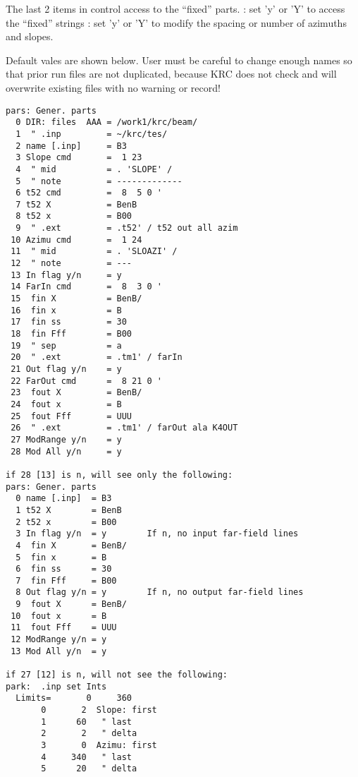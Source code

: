 \documentclass{article}
\begin{document}
The last 2 items in  control access to the ``fixed'' parts.
\qi [last-1]: set 'y' or 'Y' to access the ``fixed'' strings 
\qi [last]: set 'y' or 'Y' to modify the spacing or number of azimuths and slopes.

Default vales are shown below. User must be careful to change enough names so
that prior run files are not duplicated, because KRC does not check and will
overwrite existing files with no warning or record!

\vspace{-3.mm} 
\begin{verbatim}
pars: Gener. parts
  0 DIR: files  AAA = /work1/krc/beam/
  1  " .inp         = ~/krc/tes/
  2 name [.inp]     = B3
  3 Slope cmd       =  1 23 
  4  " mid          = . 'SLOPE' / 
  5  " note         = -------------
  6 t52 cmd         =  8  5 0 '
  7 t52 X           = BenB
  8 t52 x           = B00
  9  " .ext         = .t52' / t52 out all azim
 10 Azimu cmd       =  1 24 
 11  " mid          = . 'SLOAZI' / 
 12  " note         = ---
 13 In flag y/n     = y
 14 FarIn cmd       =  8  3 0 '
 15  fin X          = BenB/
 16  fin x          = B
 17  fin ss         = 30
 18  fin Fff        = B00
 19  " sep          = a
 20  " .ext         = .tm1' / farIn
 21 Out flag y/n    = y
 22 FarOut cmd      =  8 21 0 '
 23  fout X         = BenB/
 24  fout x         = B
 25  fout Fff       = UUU
 26  " .ext         = .tm1' / farOut ala K4OUT
 27 ModRange y/n    = y
 28 Mod All y/n     = y

if 28 [13] is n, will see only the following:
pars: Gener. parts
  0 name [.inp]  = B3
  1 t52 X        = BenB
  2 t52 x        = B00
  3 In flag y/n  = y        If n, no input far-field lines
  4  fin X       = BenB/
  5  fin x       = B
  6  fin ss      = 30
  7  fin Fff     = B00
  8 Out flag y/n = y        If n, no output far-field lines
  9  fout X      = BenB/
 10  fout x      = B
 11  fout Fff    = UUU
 12 ModRange y/n = y
 13 Mod All y/n  = y

if 27 [12] is n, will not see the following:
park:  .inp set Ints
  Limits=       0     360
       0       2  Slope: first
       1      60   " last
       2       2   " delta
       3       0  Azimu: first
       4     340   " last
       5      20   " delta
\end{verbatim}
\end{document}
